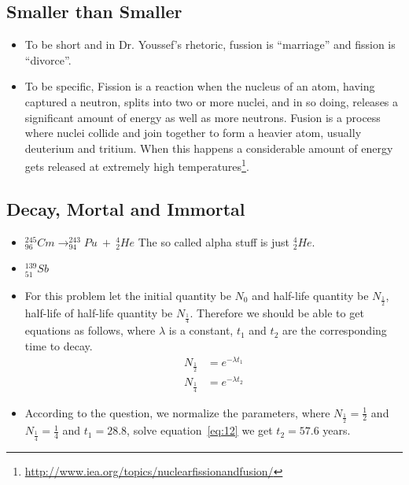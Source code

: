 \documentclass[12pt]{article}
\begin{document}
\subsection{Smaller than Smaller}
\label{sec:smaller-than-smaller}

\begin{itemize}
\item To be short and in Dr. Youssef's rhetoric, fussion is ``marriage''
  and fission is ``divorce''.
\item To be specific, Fission is a reaction when the nucleus of an
  atom, having captured a neutron, splits into two or more nuclei, and
  in so doing, releases a significant amount of energy as well as more
  neutrons.  Fusion is a process where nuclei collide and join
  together to form a heavier atom, usually deuterium and tritium. When
  this happens a considerable amount of energy gets released at
  extremely high
  temperatures\footnote{\url{http://www.iea.org/topics/nuclearfissionandfusion/}}. 
\end{itemize}

\subsection{Decay, Mortal and Immortal}
\label{sec:decay-mort-immort}

\begin{itemize}
\item $^{245}_{96}Cm\rightarrow ^{243}_{94}Pu~+~^{4}_{2}He$ The so
  called alpha stuff is just $^{4}_{2}He$.
\item $^{139}_{51}Sb$
\item For this problem let the initial quantity be $N_{0}$ and
  half-life quantity be $N_{\frac{1}{2}}$, half-life of half-life
  quantity be $N_{\frac{1}{4}}$. Therefore we should be able to get
  equations as follows, where $\lambda$ is a constant, $t_{1}$ and
  $t_{2}$ are the corresponding time to decay.
  \begin{equation}
    \label{eq:12}
    \begin{split}
      N_{\frac{1}{2}} & = e^{-\lambda t_{1}}\\[4pt]
      N_{\frac{1}{4}} & = e^{-\lambda t_{2}}
    \end{split}
  \end{equation}
\item According to the question, we normalize the parameters, where
  $N_{\frac{1}{2}}=\frac{1}{2}$ and $N_{\frac{1}{4}}=\frac{1}{4}$ and
  $t_{1}=28.8$, solve equation~\eqref{eq:12} we get $t_{2}=57.6$ years.
\end{itemize}
\end{document}

